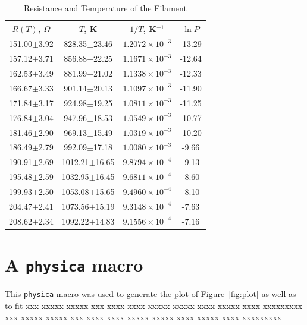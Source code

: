 \documentclass{article}
\begin{document}
\begin{table}[h]
\caption{Resistance and Temperature of the Filament}
\label{tab:data}
\vspace{0.15in}
\begin{center}
\begin{tabular}{|c|c|c|c|}
\hline
$R(T)$, $\Omega$ & $T$, K & $1/T$, K$^{-1}$ & $\ln P$ \\
\hline
151.00$\pm$3.92 & 828.35$\pm$23.46& $1.2072\times10^{-3}$& -13.29 \\
157.12$\pm$3.71 & 856.88$\pm$22.25& $1.1671\times10^{-3}$& -12.64 \\
162.53$\pm$3.49 & 881.99$\pm$21.02& $1.1338\times10^{-3}$& -12.33 \\
166.67$\pm$3.33 & 901.14$\pm$20.13& $1.1097\times10^{-3}$& -11.90 \\
171.84$\pm$3.17 & 924.98$\pm$19.25& $1.0811\times10^{-3}$& -11.25 \\ 
176.84$\pm$3.04 & 947.96$\pm$18.53& $1.0549\times10^{-3}$& -10.77 \\
181.46$\pm$2.90 & 969.13$\pm$15.49& $1.0319\times10^{-3}$& -10.20 \\
186.49$\pm$2.79 & 992.09$\pm$17.18& $1.0080\times10^{-3}$& -9.66 \\
190.91$\pm$2.69 & 1012.21$\pm$16.65& $9.8794\times10^{-4}$& -9.13 \\
195.48$\pm$2.59 & 1032.95$\pm$16.45& $9.6811\times10^{-4}$& -8.60 \\
199.93$\pm$2.50 & 1053.08$\pm$15.65& $9.4960\times10^{-4}$& -8.10 \\
204.47$\pm$2.41 & 1073.56$\pm$15.19& $9.3148\times10^{-4}$& -7.63 \\
208.62$\pm$2.34 & 1092.22$\pm$14.83& $9.1556\times10^{-4}$& -7.16 \\
\hline
\end{tabular}
\end{center}  
\end{table}

\newpage
\section{A {\tt physica} macro}
\label{app:macro}
This {\tt physica} macro was used to generate the plot of Figure~\ref{fig:plot}
as well as to fit xxx xxxxx xxxxx xxx xxxx xxxx xxxxx xxxxx xxxx xxxxx xxxx xxxxxxxxx
xxx xxxxx xxxxx xxx xxxx xxxx xxxxx xxxxx xxxx xxxxx xxxx xxxxxxxxx
\end{document}
